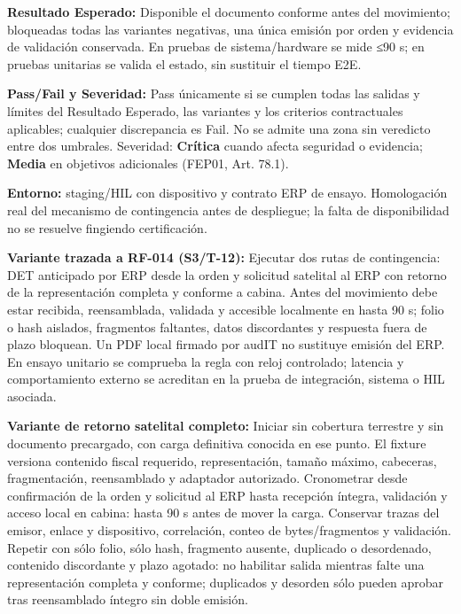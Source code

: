 \par\noindent\textbf{Resultado Esperado:} Disponible el documento conforme antes del movimiento; bloqueadas todas las variantes negativas, una única emisión por orden y evidencia de validación conservada. En pruebas de sistema/hardware se mide ≤90 s; en pruebas unitarias se valida el estado, sin sustituir el tiempo E2E.\par
\par\noindent\textbf{Pass/Fail y Severidad:} Pass únicamente si se cumplen todas las salidas y límites del Resultado Esperado, las variantes y los criterios contractuales aplicables; cualquier discrepancia es Fail. No se admite una zona sin veredicto entre dos umbrales. Severidad: \textbf{Crítica} cuando afecta seguridad o evidencia; \textbf{Media} en objetivos adicionales (FEP01, Art. 78.1).\par
\par\noindent\textbf{Entorno:} staging/HIL con dispositivo y contrato ERP de ensayo. Homologación real del mecanismo de contingencia antes de despliegue; la falta de disponibilidad no se resuelve fingiendo certificación.\par


\par\noindent\textbf{Variante trazada a RF-014 (S3/T-12):} Ejecutar dos rutas de contingencia: DET anticipado por ERP desde la orden y solicitud satelital al ERP con retorno de la representación completa y conforme a cabina. Antes del movimiento debe estar recibida, reensamblada, validada y accesible localmente en hasta 90 s; folio o hash aislados, fragmentos faltantes, datos discordantes y respuesta fuera de plazo bloquean. Un PDF local firmado por audIT no sustituye emisión del ERP. En ensayo unitario se comprueba la regla con reloj controlado; latencia y comportamiento externo se acreditan en la prueba de integración, sistema o HIL asociada.\par

\par\noindent\textbf{Variante de retorno satelital completo:} Iniciar sin cobertura terrestre y sin documento precargado, con carga definitiva conocida en ese punto. El fixture versiona contenido fiscal requerido, representación, tamaño máximo, cabeceras, fragmentación, reensamblado y adaptador autorizado. Cronometrar desde confirmación de la orden y solicitud al ERP hasta recepción íntegra, validación y acceso local en cabina: hasta 90 s antes de mover la carga. Conservar trazas del emisor, enlace y dispositivo, correlación, conteo de bytes/fragmentos y validación. Repetir con sólo folio, sólo hash, fragmento ausente, duplicado o desordenado, contenido discordante y plazo agotado: no habilitar salida mientras falte una representación completa y conforme; duplicados y desorden sólo pueden aprobar tras reensamblado íntegro sin doble emisión.\par

